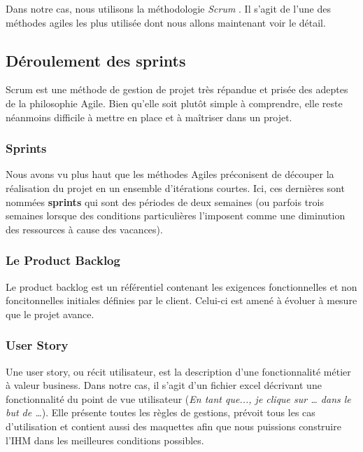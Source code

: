 	Dans notre cas, nous utilisons la méthodologie \textit{Scrum} \cite{bib_agile3}. Il s'agit de l'une des méthodes agiles les plus utilisée dont nous allons maintenant voir le détail.

\subsection{Déroulement des sprints}
\label{deroulementSprint}

	Scrum est une méthode de gestion de projet très répandue et prisée des adeptes de la philosophie Agile. Bien qu'elle soit plutôt simple à comprendre, elle reste néanmoins difficile à mettre en place et à maîtriser dans un projet. \\
	
	\subsubsection{Sprints}
	Nous avons vu plus haut que les méthodes Agiles préconisent de découper la réalisation du projet en un ensemble d'itérations courtes. Ici, ces dernières sont nommées \textbf{sprints} qui sont des périodes de deux semaines (ou parfois trois semaines lorsque des conditions particulières l'imposent comme une diminution des ressources à cause des vacances).
	
	\subsubsection{Le Product Backlog}
	Le product backlog est un référentiel contenant les exigences fonctionnelles et non foncitonnelles initiales définies par le client. Celui-ci est amené à évoluer à mesure que le projet avance.
	
	\subsubsection{User Story}
	Une user story, ou récit utilisateur, est la description d'une fonctionnalité métier à valeur business. Dans notre cas, il s'agit d'un fichier excel décrivant une fonctionnalité du point de vue utilisateur (\textit{En tant que..., je clique sur … dans le but de …}). Elle présente toutes les règles de gestions, prévoit tous les cas d'utilisation et contient aussi des maquettes afin que nous puissions construire l'IHM dans les meilleures conditions possibles.
	
